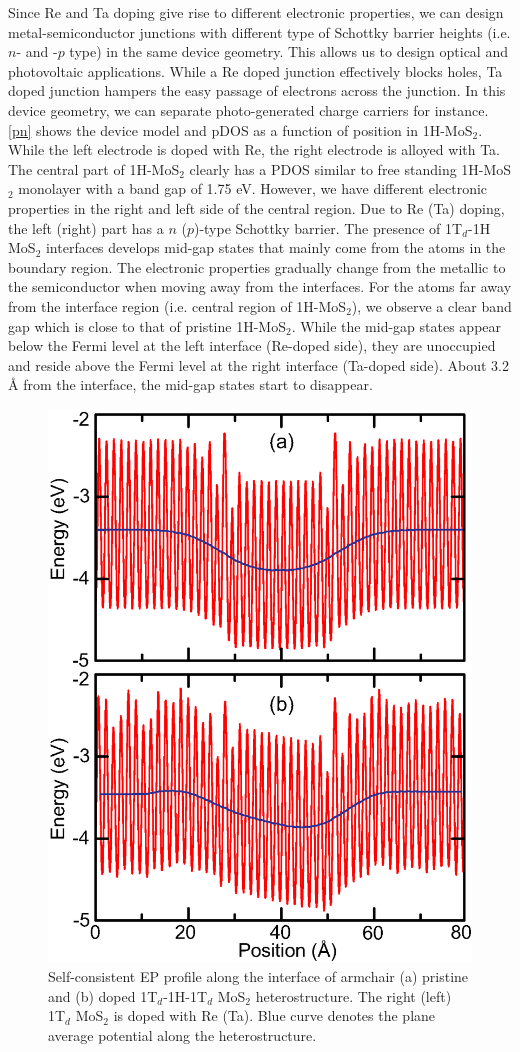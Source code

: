 Since Re and Ta doping give rise to different electronic properties, we can design metal-semiconductor
junctions with different type of Schottky barrier heights (i.e. $n$- and -$p$ type) in the same device geometry. This allows us to design 
optical and photovoltaic applications. While a Re doped junction effectively blocks holes, Ta doped junction hampers the easy passage of electrons across the junction. In this device geometry, we can separate  photo-generated charge carriers for instance. \autoref{pn} shows the device model and pDOS as a function of position in 1H-MoS$_2$. While the left electrode is doped with Re, the right electrode is alloyed with Ta.  The central part of 1H-MoS$_2$ clearly has a PDOS similar to free standing 1H-MoS$_2$ monolayer with a band gap of 1.75 eV.  However, we have different electronic properties in the right and left side of the central region.
Due to Re (Ta) doping, the left (right) part has a $n$ ($p$)-type Schottky barrier.  
The presence of 1T$_d$-1H MoS$_2$ interfaces develops mid-gap states that mainly come from the atoms in the
boundary region. The electronic properties gradually change from the metallic to the semiconductor when moving away from the interfaces.  For the atoms far away from the interface region (i.e. central region of 1H-MoS$_2$), we observe a clear band gap which is close to that of pristine 1H-MoS$_2$. While the mid-gap states appear below the Fermi level at the left interface (Re-doped side), they are unoccupied and reside above the Fermi level at the right interface (Ta-doped side).  About 3.2 {\AA} from the interface, the mid-gap states start to disappear.  

\begin{figure}[htb]
\centering
\includegraphics[width=0.6\linewidth]{potential.eps}
\caption{\label{potential}Self-consistent EP profile along the interface of armchair (a) pristine and (b) doped 1T$_d$-1H-1T$_d$ MoS$_2$ heterostructure.  The right (left) 1T$_d$ MoS$_2$ is doped with Re (Ta). Blue curve denotes the plane average potential along the heterostructure. }
\end{figure}

